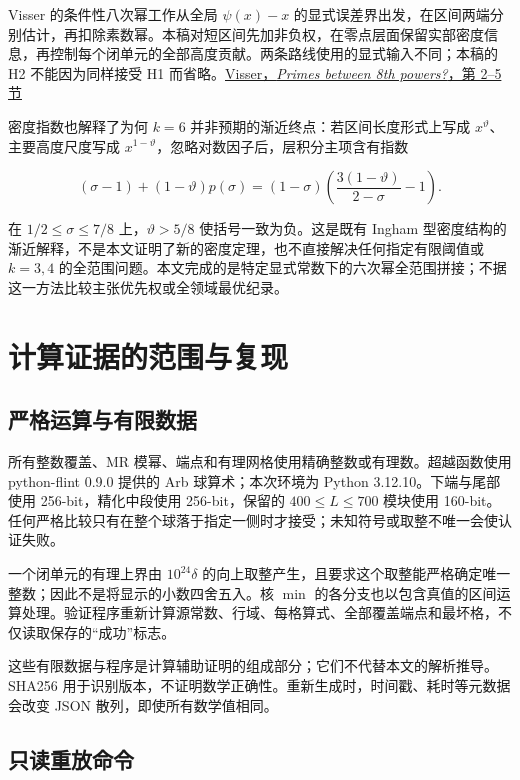 \documentclass[UTF8,zihao=-4,fontset=fandol]{ctexart}
\begin{document}
Visser 的条件性八次幂工作从全局 \(\psi(x)-x\) 的显式误差界出发，在区间两端分别估计，再扣除素数幂。本稿对短区间先加非负权，在零点层面保留实部密度信息，再控制每个闭单元的全部高度贡献。两条路线使用的显式输入不同；本稿的 H2 不能因为同样接受 H1 而省略。\href{https://arxiv.org/html/2610.20058v1}{Visser，\emph{Primes between 8th powers?}，第 2–5 节}~\cite{Visser}

密度指数也解释了为何 \(k=6\) 并非预期的渐近终点：若区间长度形式上写成 \(x^\vartheta\)、主要高度尺度写成 \(x^{1-\vartheta}\)，忽略对数因子后，层积分主项含有指数

\[
(\sigma-1)+(1-\vartheta)p(\sigma)
=(1-\sigma)\left(\frac{3(1-\vartheta)}{2-\sigma}-1\right).
\]

在 \(1/2\le\sigma\le7/8\) 上，\(\vartheta>5/8\) 使括号一致为负。这是既有 Ingham 型密度结构的渐近解释，不是本文证明了新的密度定理，也不直接解决任何指定有限阈值或 \(k=3,4\) 的全范围问题。本文完成的是特定显式常数下的六次幂全范围拼接；不据这一方法比较主张优先权或全领域最优纪录。

\section{计算证据的范围与复现}

\subsection{严格运算与有限数据}

所有整数覆盖、MR 模幂、端点和有理网格使用精确整数或有理数。超越函数使用 python-flint 0.9.0 提供的 Arb 球算术；本次环境为 Python 3.12.10。下端与尾部使用 256-bit，精化中段使用 256-bit，保留的 \(400\le L\le700\) 模块使用 160-bit。任何严格比较只有在整个球落于指定一侧时才接受；未知符号或取整不唯一会使认证失败。

一个闭单元的有理上界由 \(10^{24}\delta\) 的向上取整产生，且要求这个取整能严格确定唯一整数；因此不是将显示的小数四舍五入。核 \(\min\) 的各分支也以包含真值的区间运算处理。验证程序重新计算源常数、行域、每格算式、全部覆盖端点和最坏格，不仅读取保存的“成功”标志。

这些有限数据与程序是计算辅助证明的组成部分；它们不代替本文的解析推导。SHA256 用于识别版本，不证明数学正确性。重新生成时，时间戳、耗时等元数据会改变 JSON 散列，即使所有数学值相同。

\subsection{只读重放命令}
\end{document}
